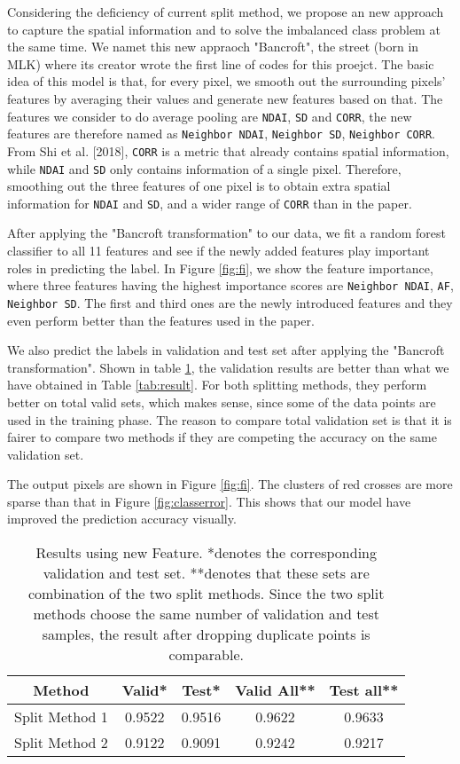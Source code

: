 \documentclass[letterpaper,11pt]{article}
\begin{document}
Considering the deficiency of current split method, we propose an new approach to capture the spatial information and to solve the imbalanced class problem at the same time. We namet this new appraoch "Bancroft", the street (born in MLK) where its creator wrote the first line of codes for this proejct. The basic idea of this model is that, for every pixel, we smooth out the surrounding pixels' features by averaging their values and generate new features based on that. The features we consider to do average pooling are \texttt{NDAI}, \texttt{SD} and \texttt{CORR}, the new features are therefore named as \texttt{Neighbor NDAI}, \texttt{Neighbor SD}, \texttt{Neighbor CORR}. From Shi et al. [2018],  \texttt{CORR} is a metric that already contains spatial information, while \texttt{NDAI} and \texttt{SD} only contains information of a single pixel. Therefore, smoothing out the three features of one pixel is to obtain extra spatial information for \texttt{NDAI} and \texttt{SD}, and a wider range of \texttt{CORR} than in the paper.

After applying the "Bancroft transformation" to our data, we fit a random forest classifier to all 11 features and see if the newly added features play important roles in predicting the label. In Figure \ref{fig:fi}, we show the feature importance, where three features having the highest importance scores are \texttt{Neighbor NDAI}, \texttt{AF},  \texttt{Neighbor SD}. The first and third ones are the newly introduced features and they even perform better than the features used in the paper. 

We also predict the labels in validation and test set after applying the "Bancroft transformation". Shown in table \ref{tab:newfeatureresult}, the validation results are better than what we have obtained in Table \ref{tab:result}. For both splitting methods, they perform better on total valid sets, which makes sense, since some of the data points are used in the training phase. The reason to compare total validation set is that it is fairer to compare two methods if they are competing the accuracy on the same validation set.

The output pixels are shown in Figure \ref{fig:fi}. The clusters of red crosses are more sparse than that in Figure \ref{fig:classerror}. This shows that our model have improved the prediction accuracy visually.
\begin{table}[]
    \centering
    \begin{tabular}{|c|c|c|c|c|} \hline
         Method & Valid* & Test* & Valid All** & Test all** \\ \hline
         Split Method 1& 0.9522 & 0.9516 & 0.9622 & 0.9633 \\ \hline
         Split Method 2 & 0.9122 & 0.9091 & 0.9242 & 0.9217 \\ \hline
    \end{tabular}
    \caption{Results using new Feature. *denotes the corresponding validation and test set. **denotes that these sets are combination of the two split methods. Since the two split methods choose the same number of validation and test samples, the result after dropping duplicate points is comparable.}
    \label{tab:newfeatureresult}
\end{table}
\end{document}
